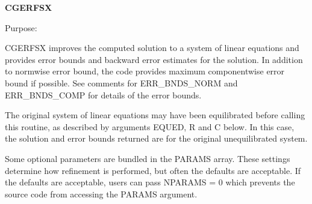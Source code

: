 {\bfseries C\+G\+E\+R\+F\+S\+X} 

 \begin{DoxyParagraph}{Purpose\+: }
\begin{DoxyVerb}    CGERFSX improves the computed solution to a system of linear
    equations and provides error bounds and backward error estimates
    for the solution.  In addition to normwise error bound, the code
    provides maximum componentwise error bound if possible.  See
    comments for ERR_BNDS_NORM and ERR_BNDS_COMP for details of the
    error bounds.

    The original system of linear equations may have been equilibrated
    before calling this routine, as described by arguments EQUED, R
    and C below. In this case, the solution and error bounds returned
    are for the original unequilibrated system.\end{DoxyVerb}
 \begin{DoxyVerb}     Some optional parameters are bundled in the PARAMS array.  These
     settings determine how refinement is performed, but often the
     defaults are acceptable.  If the defaults are acceptable, users
     can pass NPARAMS = 0 which prevents the source code from accessing
     the PARAMS argument.\end{DoxyVerb}

\end{DoxyParagraph}

